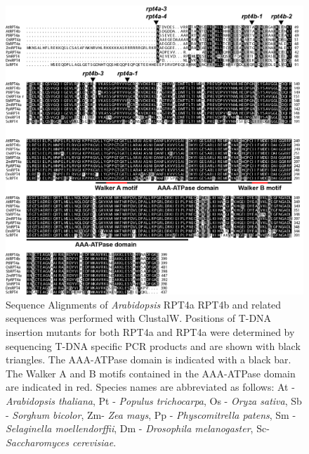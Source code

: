 \beginsupplement
\begin{figure}[ht]
	\centering
	\includegraphics[width=\columnwidth]{Proteasome/suprpt4mut.png}
	{Sequence Alignments of \textit{Arabidopsis} RPT4a RPT4b and related sequences was performed with ClustalW. Positions of T-DNA insertion mutants for both RPT4a and RPT4a were determined by sequencing T-DNA specific PCR products and are shown with black triangles. The AAA-ATPase domain is indicated with a black bar. The Walker A and B motifs contained in the AAA-ATPase domain are indicated in red. Species names are abbreviated as follows: At - \textit{Arabidopsis thaliana}, Pt - \textit{Populus trichocarpa}, Os - \textit{Oryza sativa}, Sb - \textit{Sorghum bicolor}, Zm- \textit{Zea mays}, Pp - \textit{Physcomitrella patens}, Sm - \textit{Selaginella moellendorffii}, Dm - \textit{Drosophila melanogaster}, Sc- \textit{Saccharomyces cerevisiae}.}
	\label{fig:suprpt4}
\end{figure}

